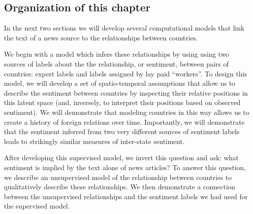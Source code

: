 
\subsection*{Organization of this chapter}

In the next two sections we will develop several computational models that
link the text of a news source to the relationships between countries.

We begin with a model which infers these relationships by using using
two sources of labels about the the relationship, or sentiment,
between pairs of countries: expert labels and labels assigned by lay
paid ``workers''.  To design this model, we will develop a set of
spatio-temporal assumptions that allow us to describe the sentiment
between countries by inspecting their relative positions in this
latent space (and, inversely, to interpret their positions based on
observed sentiment).  We will demonstrate that modeling countries in
this way allows us to create a history of foreign relations over time.
Importantly, we will demonstrate that the sentiment inferred from two
very different sources of sentiment labels leads to strikingly similar
measures of inter-state sentiment.

After developing this supervised model, we invert this question and
ask: what sentiment is implied by the text alone of news articles?  To
answer this question, we describe an unsupervised model of the
relationship between countries to qualitatively describe these
relationships.  We then demonstrate a connection between the
unsupervised relationships and the sentiment labels we had used for
the supervised model.
